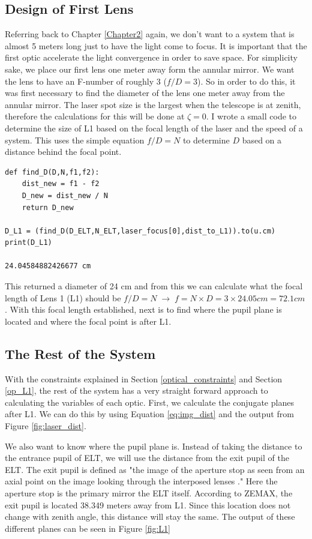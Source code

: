 \subsection{Design of First Lens}
\label{sec:L1_des}
Referring back to Chapter \ref{Chapter2} again, we don't want to a system that is
almost 5 meters long just to have the light come to focus.  It is important that the
first optic accelerate the light convergence in order to save space.  For simplicity
sake, we place our first lens one meter away form the annular mirror.  We want the
lens to have an F-number of roughly 3 ($f/D = 3$).  So in order to do this, it was
first necessary to find the diameter of the lens one meter away from the annular
mirror.  The laser spot size is the largest when the telescope is at zenith,
therefore the calculations for this will be done at $\zeta = 0$. I wrote a small
code to determine the size of L1 based on the focal length of the laser and the
speed of a system.  This uses the simple equation $f/D = N$ to determine $D$ based
on a distance behind the focal point.

\begin{lstlisting}
def find_D(D,N,f1,f2):
    dist_new = f1 - f2
    D_new = dist_new / N
    return D_new
    
D_L1 = (find_D(D_ELT,N_ELT,laser_focus[0],dist_to_L1)).to(u.cm)
print(D_L1)

24.04584882426677 cm
\end{lstlisting}

This returned a diameter of 24 cm and from this we can calculate what the focal
length of Lens 1 (L1) should be $f/D = N \; \rightarrow \; f = N \times D = 3 \times 24.05cm
= 72.1 cm$.  With this focal length established, next is to find where the pupil
plane is located and where the focal point is after L1.
\label{op_L1}

\subsection{The Rest of the System}
\label{sec:sys_require}

With the constraints explained in Section \ref{optical_constraints} and Section
\ref{op_L1}, the rest of the system has a very straight forward approach to
calculating the variables of each optic.  First, we calculate the conjugate planes
after L1.  We can do this by using Equation \ref{eq:img_dist} and the output from
Figure \ref{fig:laser_dist}.  

We also want to know where the pupil plane is.  Instead of taking the distance to
the entrance pupil of ELT, we will use the distance from the exit pupil of the ELT.
The exit pupil is defined as "the image of the aperture stop as seen from an axial
point on the image looking through the interposed lenses \cite{Hecht}."  Here the
aperture stop is the primary mirror the ELT itself.  According to ZEMAX, the exit
pupil is located 38.349 meters away from L1.  Since this location does not change
with zenith angle, this distance will stay the same.  The output of these different
planes can be seen in Figure \ref{fig:L1}


